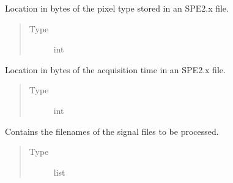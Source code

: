 \documentclass[a4paper,10pt,english]{sphinxmanual}
\begin{document}
\begin{fulllineitems}
\begin{fulllineitems}
\begin{quote}
\begin{description}
\end{description}\end{quote}

\end{fulllineitems}


\begin{fulllineitems}
\label{\detokenize{sfgtools:sfgtools.SFGProcessTools.pixeltype_loc}}
\sphinxAtStartPar
Location in bytes of the pixel type stored in an SPE2.x file.
\begin{quote}\begin{description}
\item[{Type}] \leavevmode
\sphinxAtStartPar
int

\end{description}\end{quote}

\end{fulllineitems}


\begin{fulllineitems}
\label{\detokenize{sfgtools:sfgtools.SFGProcessTools.acqtime_loc}}
\sphinxAtStartPar
Location in bytes of the acquisition time in an SPE2.x file.
\begin{quote}\begin{description}
\item[{Type}] \leavevmode
\sphinxAtStartPar
int

\end{description}\end{quote}

\end{fulllineitems}


\begin{fulllineitems}
\label{\detokenize{sfgtools:sfgtools.SFGProcessTools.signal_names}}
\sphinxAtStartPar
Contains the filenames of the signal files to be processed.
\begin{quote}\begin{description}
\item[{Type}] \leavevmode
\sphinxAtStartPar
list


\end{description}
\end{quote}
\end{fulllineitems}
\end{fulllineitems}
\end{document}
